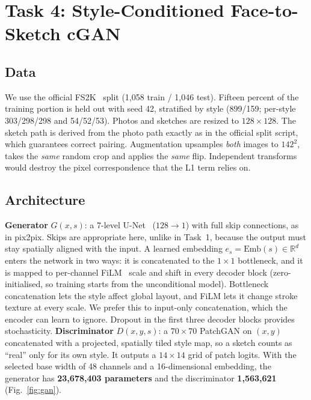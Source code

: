 ﻿\documentclass[conference]{IEEEtran}
\begin{document}
\section{Task 4: Style-Conditioned Face-to-Sketch cGAN}\label{sec:t4}
\subsection{Data}
We use the official FS2K~\cite{fan2022fs2k} split (1,058 train / 1,046 test). Fifteen percent of the
training portion is held out with seed 42, stratified by style (899/159; per-style 303/298/298 and
54/52/53). Photos and sketches are resized to $128\times128$. The sketch path is derived from the photo
path exactly as in the official split script, which guarantees correct pairing. Augmentation upsamples
\emph{both} images to $142^2$, takes the \emph{same} random crop and applies the \emph{same} flip.
Independent transforms would destroy the pixel correspondence that the L1 term relies on.

\subsection{Architecture}
\textbf{Generator} $G(x,s)$: a 7-level U-Net~\cite{ronneberger2015unet} ($128\to1$) with full skip
connections, as in pix2pix. Skips are appropriate here, unlike in Task~1, because the output must stay
spatially aligned with the input. A learned embedding $e_s=\text{Emb}(s)\in\mathbb{R}^d$ enters the
network in two ways: it is concatenated to the $1\times1$ bottleneck, and it is mapped to per-channel
FiLM~\cite{perez2018film} scale and shift in every decoder block (zero-initialised, so training starts
from the unconditional model). Bottleneck concatenation lets the style affect global layout, and FiLM
lets it change stroke texture at every scale. We prefer this to input-only concatenation, which the
encoder can learn to ignore. Dropout in the first three decoder blocks provides stochasticity.
\textbf{Discriminator} $D(x,y,s)$: a $70\times70$ PatchGAN on $(x,y)$ concatenated with a projected,
spatially tiled style map, so a sketch counts as ``real'' only for its own style. It outputs a
$14\times14$ grid of patch logits. With the selected base width of 48 channels and a 16-dimensional
embedding, the generator has \textbf{23,678,403 parameters} and the discriminator \textbf{1,563,621}
(Fig.~\ref{fig:gan}).
\end{document}
